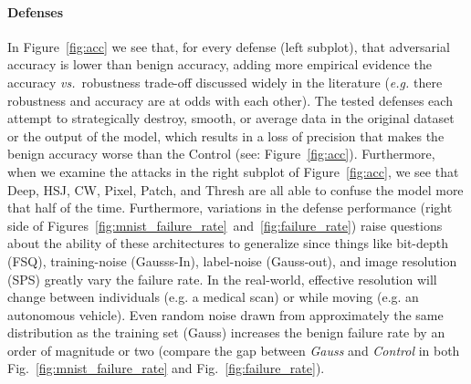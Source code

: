 \documentclass[journal]{IEEEtran}
\newcommand{\eg}{\textit{e.g.}\xspace}
\begin{document}
\paragraph{Defenses}
    In Figure~\ref{fig:acc} we see that, for every defense (left subplot), that adversarial accuracy is lower than benign accuracy, adding more empirical evidence the accuracy \textit{vs.}~robustness trade-off discussed widely in the literature (\eg there robustness and accuracy are at odds with each other). The tested defenses each attempt to strategically destroy, smooth, or average data in the original dataset or the output of the model, which results in a loss of precision that makes the benign accuracy worse than the Control (see: Figure~\ref{fig:acc}). Furthermore, when we examine the attacks in the right subplot of Figure~\ref{fig:acc}, we see that Deep, HSJ, CW, Pixel, Patch, and Thresh are all able to confuse the model more that half of the time. Furthermore, variations in the defense performance (right side of Figures~\ref{fig:mnist_failure_rate}~and~\ref{fig:failure_rate}) raise questions about the ability of these architectures to generalize since things like bit-depth (FSQ), training-noise (Gausss-In), label-noise (Gauss-out), and image resolution (SPS) greatly vary the failure rate. In the real-world, effective resolution will change between individuals (e.g. a medical scan) or while moving (e.g. an autonomous vehicle). Even random noise drawn from approximately the same distribution as the training set (Gauss) increases the benign failure rate by an order of magnitude or two (compare the gap between \textit{Gauss} and \textit{Control} in both Fig.~\ref{fig:mnist_failure_rate} and Fig.~\ref{fig:failure_rate}). 
    
\end{document}
